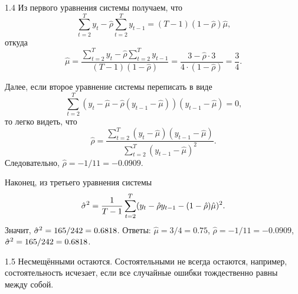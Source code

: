 \begin{solution}{{1.4}}
Из первого уравнения системы получаем, что
\[
\sum_{t=2}^{T}y_{t} - \hat{\rho} \sum_{t=2}^{T}y_{t-1} = (T - 1) (1- \hat{\rho}) \hat{\mu} \text{,}
\]
откуда
\[
\hat{\mu} = \frac{\sum_{t=2}^{T}y_{t} - \hat{\rho} \sum_{t=2}^{T}y_{t-1}}{(T - 1) (1- \hat{\rho})} = \frac{3 - \hat{\rho} \cdot 3}{4\cdot(1-\hat{\rho})} = \frac{3}{4} \text{.}
\]

Далее, если второе уравнение системы переписать в виде
\[
\sum_{t=2}^{T}(y_t - \hat{\mu} - \hat{\rho} (y_{t-1} - \hat{\mu}))(y_{t-1} - \hat{\mu}) = 0 \text{,}
\]
то легко видеть, что
\[
\hat{\rho} = \frac{\sum_{t=2}^{T}(y_t - \hat{\mu})(y_{t-1} - \hat{\mu})}{\sum_{t=2}^{T}(y_{t-1} - \hat{\mu})^2} \text{.}
\]
Следовательно, $\hat{\rho} =-1/11= -0.0909$.

Наконец, из третьего уравнения системы
\[
\hat{\sigma}^2 =\frac{1}{T-1} \sum_{t=2}^{T}(y_t - \hat{\rho} y_{t-1} - (1 - \hat{\rho}) \hat{\mu})^2 \text{.}
\]
Значит, $\hat{\sigma}^2 = 165/242= 0.6818$. Ответы: $\hat{\mu} = 3/4= 0.75$, $\hat{\rho} = -1/11=-0.0909$, $\hat{\sigma}^2 =165/242=0.6818$.
\end{solution}
\protect \hypertarget {soln:1.5}{}
\begin{solution}{{1.5}}
Несмещёнными остаются. Состоятельными не всегда остаются, например, состоятельность исчезает, если все случайные ошибки тождественно равны между собой.

\end{solution}

